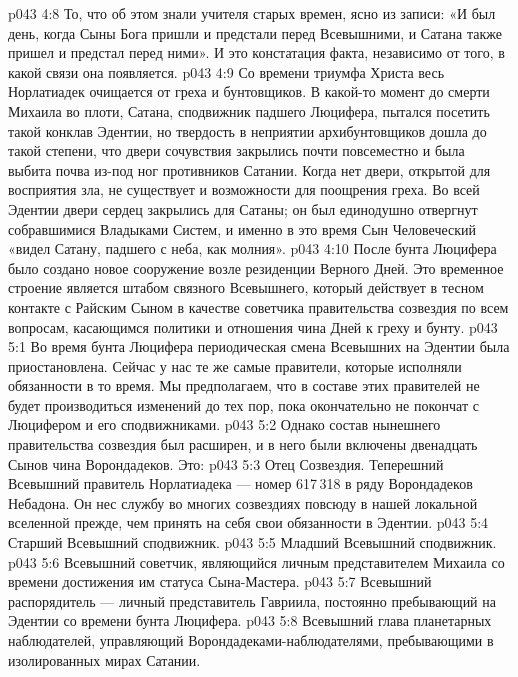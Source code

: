 \vs p043 4:8 То, что об этом знали учителя старых времен, ясно из записи: «И был день, когда Сыны Бога пришли и предстали перед Всевышними, и Сатана также пришел и предстал перед ними». И это констатация факта, независимо от того, в какой связи она появляется.
\vs p043 4:9 \pc Со времени триумфа Христа весь Норлатиадек очищается от греха и бунтовщиков. В какой\hyp{}то момент до смерти Михаила во плоти, Сатана, сподвижник падшего Люцифера, пытался посетить такой конклав Эдентии, но твердость в неприятии архибунтовщиков дошла до такой степени, что двери сочувствия закрылись почти повсеместно и была выбита почва из\hyp{}под ног противников Сатании. Когда нет двери, открытой для восприятия зла, не существует и возможности для поощрения греха. Во всей Эдентии двери сердец закрылись для Сатаны; он был единодушно отвергнут собравшимися Владыками Систем, и именно в это время Сын Человеческий «видел Сатану, падшего с неба, как молния».
\vs p043 4:10 После бунта Люцифера было создано новое сооружение возле резиденции Верного Дней. Это временное строение является штабом связного Всевышнего, который действует в тесном контакте с Райским Сыном в качестве советчика правительства созвездия по всем вопросам, касающимся политики и отношения чина Дней к греху и бунту.
\vs p043 5:1 Во время бунта Люцифера периодическая смена Всевышних на Эдентии была приостановлена. Сейчас у нас те же самые правители, которые исполняли обязанности в то время. Мы предполагаем, что в составе этих правителей не будет производиться изменений до тех пор, пока окончательно не покончат с Люцифером и его сподвижниками.
\vs p043 5:2 Однако состав нынешнего правительства созвездия был расширен, и в него были включены двенадцать Сынов чина Ворондадеков. Это:
\vs p043 5:3 \bibnobreakspace Отец Созвездия. Теперешний Всевышний правитель Норлатиадека --- номер 617\,318 в ряду Ворондадеков Небадона. Он нес службу во многих созвездиях повсюду в нашей локальной вселенной прежде, чем принять на себя свои обязанности в Эдентии.
\vs p043 5:4 \bibnobreakspace Старший Всевышний сподвижник.
\vs p043 5:5 \bibnobreakspace Младший Всевышний сподвижник.
\vs p043 5:6 \bibnobreakspace Всевышний советчик, являющийся личным представителем Михаила со времени достижения им статуса Сына\hyp{}Мастера.
\vs p043 5:7 \bibnobreakspace Всевышний распорядитель --- личный представитель Гавриила, постоянно пребывающий на Эдентии со времени бунта Люцифера.
\vs p043 5:8 \bibnobreakspace Всевышний глава планетарных наблюдателей, управляющий Ворондадеками\hyp{}наблюдателями, пребывающими в изолированных мирах Сатании.
